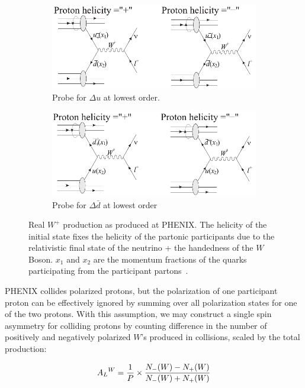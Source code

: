 \begin{figure}[ht]
  \centering
  \begin{subfigure}[b]{\textwidth}
    \centering
    \includegraphics[width=0.8\linewidth]{./figures/w_plus_u_probe.pdf}
    \caption{
      Probe for $\Delta u$ at lowest order.
    }
    \label{fig:u_probe}
  \end{subfigure}
  \begin{subfigure}[t]{\textwidth}
    \centering
    \includegraphics[width=0.8\linewidth]{./figures/w_plus_dbar_probe.pdf}
    \caption{
      Probe for $\Delta\bar{d}$ at lowest order
    }
    \label{fig:dbar_probe}
  \end{subfigure}
  \caption{
    Real $W^+$ production as produced at PHENIX. The helicity of the initial
    state fixes the helicity of the partonic participants due to the
    relativistic final state of the neutrino + the handedness of the $W$ Boson.
    $x_1$ and $x_2$ are the momentum fractions of the quarks participating from
    the participant partons~\cite{Aidala2005}. 
  }
  \label{fig:w_probe_leading_order}
\end{figure}

PHENIX collides polarized protons, but the polarization of one participant
proton can be effectively ignored by summing over all polarization states for
one of the two protons. With this assumption, we may construct a single spin
asymmetry for colliding protons by counting difference in the number of
positively and negatively polarized $W$'s produced in collisions, scaled by the
total production:

\begin{equation}
  {{A_L}^W} =
  {{{1}\over{P}}\times{{N_{-}(W)-N_{+}(W)}\over{{N_{-}(W)+N_{+}(W)}}} }
  \label{eq:w_production_asymmetry}
\end{equation}

